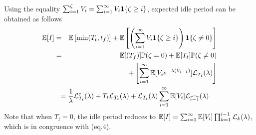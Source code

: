 \documentclass[journal]{IEEEtran}
\newcommand {\bear} {\begin{eqnarray}}
\newcommand {\eear} {\end{eqnarray}}
\def \E{{\mathbb E}}
\def \P{{\mathbb P}}
\def\bone{{\mathrm 1\!\!I}}
\def\bone{{\textbf 1}}
\begin{document}
Using the equality $\sum_{i=1}^{\zeta} V_i=\sum_{i=1}^{\infty}
V_i{\bone {\{\zeta \geq i\}}}$, expected idle period can be obtained
as follows
\bear
\nonumber \E[I]&=&\E\left[\min(T_t,t_f)\right]+\E\left[\left(\sum_{i=1}^{\infty} V_i{\bone {\{\zeta \geq i\}}}\right){\bone {\{\zeta\neq 0\}}}\right]\\
\nonumber &=&\E[(T_f)]\P(\zeta=0)+\E[T_t]\P(\zeta \neq 0)\\
&&\nonumber + \left[\sum_{i=1}^{\infty} \E [V_i e^{-\lambda(\hat{V}_{i-1})} ]{\cal L}_{T_t}(\lambda)\right]\\
\label{e:EI} &&\hspace{-10mm}=\frac{1}{\lambda}{\cal L}^c_{T_t}(\lambda)+T_t {\cal L}_{T_t}(\lambda)+ {\cal L}_{T_t}(\lambda)\sum_{i=1}^{\infty}\E[V_i] {\cal L}_{\widehat{i-1}}(\lambda)\hspace{4mm}
\eear
Note that when $T_t=0$, the idle period reduces to
$\E[I]=\sum_{i=1}^{\infty} \E [V_i]\prod_{k=1}^{i-1} {\cal L}_k(\lambda)$, which
is in congruence with \cite{Qest08}(eq.4).
\end{document}
